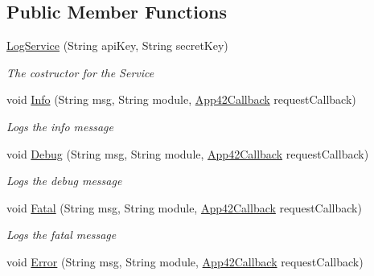 \subsection*{Public Member Functions}
\begin{DoxyCompactItemize}
\item 
\hyperlink{classcom_1_1shephertz_1_1app42_1_1paas_1_1sdk_1_1windows_1_1log_1_1_log_service_acbe39bfe75681da471bbdc1d3466abd6}{Log\+Service} (String api\+Key, String secret\+Key)
\begin{DoxyCompactList}\small\item\em The costructor for the Service \end{DoxyCompactList}\item 
void \hyperlink{classcom_1_1shephertz_1_1app42_1_1paas_1_1sdk_1_1windows_1_1log_1_1_log_service_a540353b208f9db9a781dbb6ef93d4d66}{Info} (String msg, String module, \hyperlink{interfacecom_1_1shephertz_1_1app42_1_1paas_1_1sdk_1_1windows_1_1_app42_callback}{App42\+Callback} request\+Callback)
\begin{DoxyCompactList}\small\item\em Logs the info message \end{DoxyCompactList}\item 
void \hyperlink{classcom_1_1shephertz_1_1app42_1_1paas_1_1sdk_1_1windows_1_1log_1_1_log_service_ace2f86ba97c2b1eb088ab9df04903f58}{Debug} (String msg, String module, \hyperlink{interfacecom_1_1shephertz_1_1app42_1_1paas_1_1sdk_1_1windows_1_1_app42_callback}{App42\+Callback} request\+Callback)
\begin{DoxyCompactList}\small\item\em Logs the debug message \end{DoxyCompactList}\item 
void \hyperlink{classcom_1_1shephertz_1_1app42_1_1paas_1_1sdk_1_1windows_1_1log_1_1_log_service_a2f82b4ccefe4863aa411521aa64cd73f}{Fatal} (String msg, String module, \hyperlink{interfacecom_1_1shephertz_1_1app42_1_1paas_1_1sdk_1_1windows_1_1_app42_callback}{App42\+Callback} request\+Callback)
\begin{DoxyCompactList}\small\item\em Logs the fatal message \end{DoxyCompactList}\item 
void \hyperlink{classcom_1_1shephertz_1_1app42_1_1paas_1_1sdk_1_1windows_1_1log_1_1_log_service_a8e3fa574ea0d5e1b44d462a8f46cf0b3}{Error} (String msg, String module, \hyperlink{interfacecom_1_1shephertz_1_1app42_1_1paas_1_1sdk_1_1windows_1_1_app42_callback}{App42\+Callback} request\+Callback)

\end{DoxyCompactItemize}
